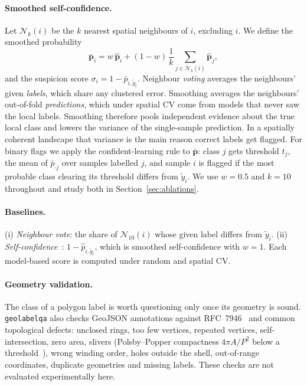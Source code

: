\documentclass[11pt]{article}
\begin{document}
\paragraph{Smoothed self-confidence.}
Let $\mathcal{N}_k(i)$ be the $k$ nearest spatial neighbours of $i$, excluding
$i$. We define the smoothed probability
\begin{equation}
\bar{\mathbf{p}}_i = w\,\hat{\mathbf{p}}_i + (1-w)\,\frac{1}{k}\sum_{j\in\mathcal{N}_k(i)}\hat{\mathbf{p}}_j ,
\end{equation}
and the suspicion score $\sigma_i = 1 - \bar p_{i,\tilde y_i}$. Neighbour
\emph{voting} averages the neighbours' given \emph{labels}, which share any
clustered error. Smoothing averages the neighbours' out-of-fold
\emph{predictions}, which under spatial CV come from models that never saw the
local labels. Smoothing therefore pools independent evidence about the true local
class and lowers the variance of the single-sample prediction. In a spatially
coherent landscape that variance is the main reason correct labels get flagged.
For binary flags we apply the confident-learning rule to $\bar{\mathbf{p}}$:
class $j$ gets threshold $t_j$, the mean of $\bar p_{\cdot j}$ over samples
labelled $j$, and sample $i$ is flagged if the most probable class clearing its
threshold differs from $\tilde y_i$. We use $w = 0.5$ and $k = 10$ throughout and
study both in Section~\ref{sec:ablations}.

\paragraph{Baselines.}
(i) \emph{Neighbour vote}: the share of $\mathcal{N}_{10}(i)$ whose given label
differs from $\tilde y_i$. (ii) \emph{Self-confidence}~\citep{northcutt2021confident}:
$1-\hat p_{i,\tilde y_i}$, which is smoothed self-confidence with $w=1$. Each
model-based score is computed under random and spatial CV.

\paragraph{Geometry validation.}
The class of a polygon label is worth questioning only once its geometry is
sound. \texttt{geolabelqa} also checks GeoJSON annotations against RFC~7946~\citep{rfc7946}
and common topological defects: unclosed rings, too few vertices, repeated
vertices, self-intersection, zero area, slivers (Polsby--Popper compactness
$4\pi A/P^2$ below a threshold~\citep{polsby1991third}), wrong winding order,
holes outside the shell, out-of-range coordinates, duplicate geometries and
missing labels. These checks are not evaluated experimentally here.
\end{document}
